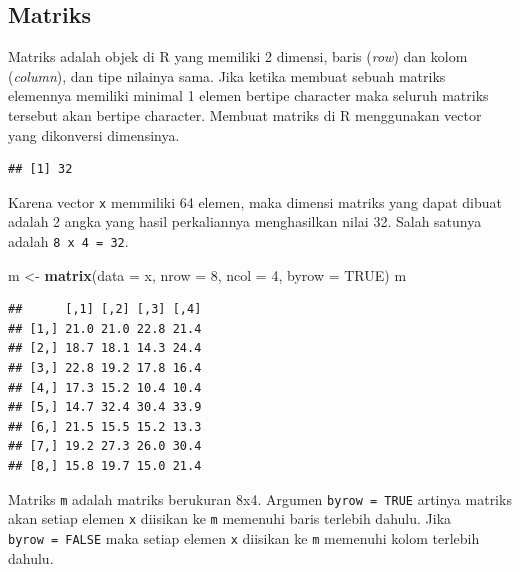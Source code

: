 \documentclass[]{book}
\newenvironment{Shaded}{\begin{snugshade}}{\end{snugshade}}
\newcommand{\CommentTok}[1]{\textcolor[rgb]{0.56,0.35,0.01}{\textit{#1}}}
\newcommand{\DataTypeTok}[1]{\textcolor[rgb]{0.13,0.29,0.53}{#1}}
\newcommand{\DecValTok}[1]{\textcolor[rgb]{0.00,0.00,0.81}{#1}}
\newcommand{\KeywordTok}[1]{\textcolor[rgb]{0.13,0.29,0.53}{\textbf{#1}}}
\newcommand{\NormalTok}[1]{#1}
\newcommand{\OperatorTok}[1]{\textcolor[rgb]{0.81,0.36,0.00}{\textbf{#1}}}
\newcommand{\OtherTok}[1]{\textcolor[rgb]{0.56,0.35,0.01}{#1}}
\newcommand{\StringTok}[1]{\textcolor[rgb]{0.31,0.60,0.02}{#1}}
\begin{document}
\hypertarget{matriks}{%
\subsection{Matriks}\label{matriks}}

Matriks adalah objek di R yang memiliki 2 dimensi, baris (\emph{row}) dan kolom (\emph{column}), dan tipe nilainya sama. Jika ketika membuat sebuah matriks elemennya memiliki minimal 1 elemen bertipe character maka seluruh matriks tersebut akan bertipe character. Membuat matriks di R menggunakan vector yang dikonversi dimensinya.

\begin{Shaded}
\end{Shaded}

\begin{verbatim}
## [1] 32
\end{verbatim}

Karena vector \texttt{x} memmiliki 64 elemen, maka dimensi matriks yang dapat dibuat adalah 2 angka yang hasil perkaliannya menghasilkan nilai 32. Salah satunya adalah \texttt{8\ x\ 4\ =\ 32}.

\begin{Shaded}
\begin{Highlighting}[]
\NormalTok{m <-}\StringTok{ }\KeywordTok{matrix}\NormalTok{(}\DataTypeTok{data =}\NormalTok{ x, }\DataTypeTok{nrow =} \DecValTok{8}\NormalTok{, }\DataTypeTok{ncol =} \DecValTok{4}\NormalTok{, }\DataTypeTok{byrow =} \OtherTok{TRUE}\NormalTok{)}
\NormalTok{m}
\end{Highlighting}
\end{Shaded}

\begin{verbatim}
##      [,1] [,2] [,3] [,4]
## [1,] 21.0 21.0 22.8 21.4
## [2,] 18.7 18.1 14.3 24.4
## [3,] 22.8 19.2 17.8 16.4
## [4,] 17.3 15.2 10.4 10.4
## [5,] 14.7 32.4 30.4 33.9
## [6,] 21.5 15.5 15.2 13.3
## [7,] 19.2 27.3 26.0 30.4
## [8,] 15.8 19.7 15.0 21.4
\end{verbatim}

Matriks \texttt{m} adalah matriks berukuran 8x4. Argumen \texttt{byrow\ =\ TRUE} artinya matriks akan setiap elemen \texttt{x} diisikan ke \texttt{m} memenuhi baris terlebih dahulu. Jika \texttt{byrow\ =\ FALSE} maka setiap elemen \texttt{x} diisikan ke \texttt{m} memenuhi kolom terlebih dahulu.
\end{document}
